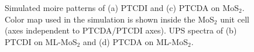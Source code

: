 \documentclass[12pt]{article}
\begin{document}
\begin{figure}[H]
\hspace{10pt}
\caption{Simulated moire patterns of (a) PTCDI and (c) PTCDA on MoS$_2$. Color map used in the simulation is shown inside the MoS$_2$ unit cell (axes independent to PTCDA/PTCDI axes). UPS spectra of (b) PTCDI on ML-MoS$_2$ and (d) PTCDA on ML-MoS$_2$.}\label{fig:Moire}
\end{figure}
\end{document}
